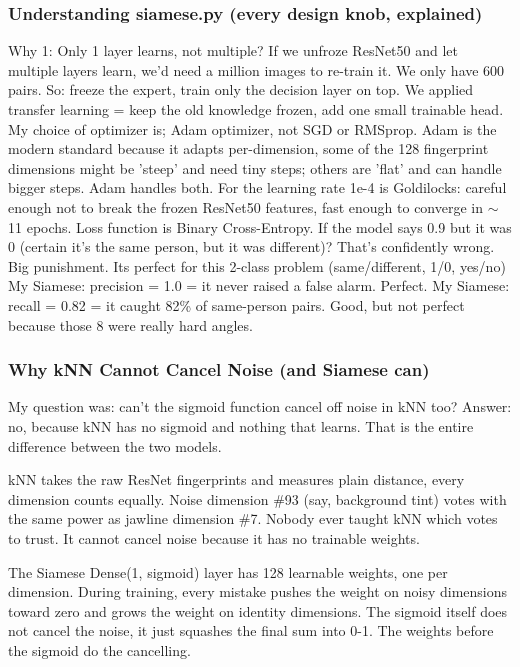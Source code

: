 \documentclass[conference]{IEEEtran}
\begin{document}
\subsubsection{Understanding siamese.py (every design knob, explained)}
Why 1: Only 1 layer learns, not multiple?
If we unfroze ResNet50 and let multiple layers learn, we'd need a million images to re-train it. We only have 600 pairs. So: freeze the expert, train only the decision layer on top. We applied transfer learning = keep the old knowledge frozen, add one small trainable head.
My choice of optimizer is; Adam optimizer, not SGD or RMSprop. Adam is the modern standard because it adapts per-dimension, some of the 128 fingerprint dimensions might be 'steep' and need tiny steps; others are 'flat' and can handle bigger steps. Adam handles both. For the learning rate 1e-4 is Goldilocks: careful enough not to break the frozen ResNet50 features, fast enough to converge in $\sim$11 epochs.
Loss function is Binary Cross-Entropy. If the model says 0.9 but it was 0 (certain it's the same person, but it was different)? That's confidently wrong. Big punishment. Its perfect for this 2-class problem (same/different, 1/0, yes/no)
My Siamese: precision = 1.0 = it never raised a false alarm. Perfect. My Siamese: recall = 0.82 = it caught 82\% of same-person pairs. Good, but not perfect because those 8 were really hard angles.

\subsubsection{Why kNN Cannot Cancel Noise (and Siamese can)}

My question was: can't the sigmoid function cancel off noise in kNN too? Answer: no, because kNN has no sigmoid and nothing that learns. That is the entire difference between the two models.

kNN takes the raw ResNet fingerprints and measures plain distance, every dimension counts equally. Noise dimension \#93 (say, background tint) votes with the same power as jawline dimension \#7. Nobody ever taught kNN which votes to trust. It cannot cancel noise because it has no trainable weights.

The Siamese Dense(1, sigmoid) layer has 128 learnable weights, one per dimension. During training, every mistake pushes the weight on noisy dimensions toward zero and grows the weight on identity dimensions. The sigmoid itself does not cancel the noise, it just squashes the final sum into 0-1. The weights before the sigmoid do the cancelling.
\end{document}
